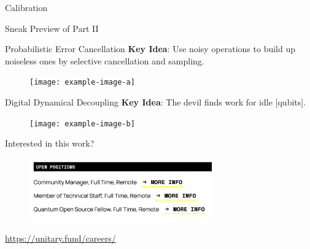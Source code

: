 \documentclass[11pt,aspectratio=1610,xcolor=dvipsnames]{beamer}
\begin{document}
\begin{frame}{Calibration}
\end{frame}

\begin{frame}{Sneak Preview of Part II}
	\begin{exampleblock}{Probabilistic Error Cancellation}
		\textbf{Key Idea}: Use noisy operations to build up noiseless ones by selective cancellation and sampling.
	\end{exampleblock}
	\begin{figure}[h]
		\centering
		\texttt{[image: example-image-a]}
	\end{figure}

	\begin{exampleblock}{Digital Dynamical Decoupling}
		\textbf{Key Idea}: The devil finds work for idle [qubits].
	\end{exampleblock}
	\begin{figure}[h]
		\centering
		\texttt{[image: example-image-b]}
	\end{figure}
\end{frame}

\begin{frame}{Interested in this work?}
	\begin{figure}[h]
		\centering
		\includegraphics[width=0.7\textwidth]{jobs}
	\end{figure}
	\begin{center}

		\url{https://unitary.fund/careers/}
	\end{center}
\end{frame}
\end{document}
